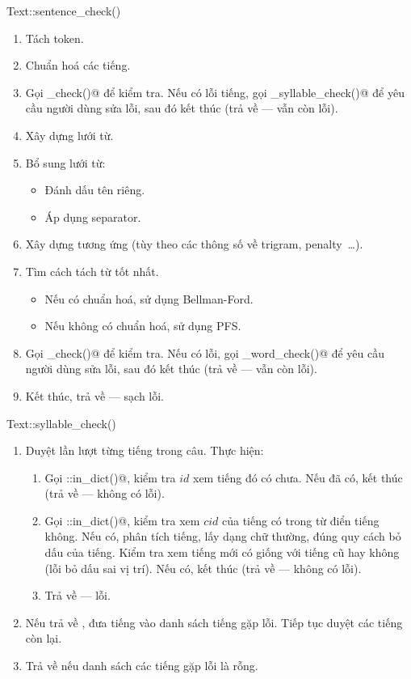 \documentclass[a4paper,oneside,14pt]{extbook} %
\begin{document}
\begin{algo}
\caption{Text::sentence\_check()}
\label{algo:Text::sentence_check}
  \begin{enumerate}
  \item Tách token.
  \item Chuẩn hoá các tiếng.
  \item Gọi \verb@syllable_check()@ để kiểm tra. Nếu có lỗi tiếng, gọi
    \verb@ui_syllable_check()@ để yêu cầu người dùng sửa lỗi, sau đó
    kết thúc (trả về \verb@false@ --- vẫn còn lỗi).
  \item Xây dựng lưới từ.
  \item Bổ sung lưới từ:
    \begin{itemize}
    \item Đánh dấu tên riêng.
    \item Áp dụng separator.
    \end{itemize}
  \item Xây dựng \verb@DAG@ tương ứng (tùy theo các thông số về
    trigram, penalty~\ldots).
  \item Tìm cách tách từ tốt nhất. 
    \begin{itemize}
    \item Nếu có chuẩn hoá, sử dụng Bellman-Ford.
    \item Nếu không có chuẩn hoá, sử dụng PFS.
    \end{itemize}
  \item Gọi \verb@word_check()@ để kiểm tra. Nếu có lỗi, gọi
    \verb@ui_word_check()@ để yêu cầu người dùng sửa lỗi, sau đó kết
    thúc (trả về \verb@false@ --- vẫn còn lỗi).
  \item Kết thúc, trả về \verb@true@ --- sạch lỗi.
  \end{enumerate}
\end{algo}

\begin{algo}
\caption{Text::syllable\_check()}
\label{algo:Text::syllable_check}
\begin{enumerate}
\item Duyệt lần lượt từng tiếng trong câu. Thực hiện:
  \begin{enumerate}
  \item Gọi \verb@VSpell::in_dict()@, kiểm tra $id$ xem tiếng đó có
    chưa. Nếu đã có, kết thúc (trả về \verb@true@ --- không có lỗi).
  \item Gọi \verb@StringArchive::in_dict()@, kiểm tra xem $cid$ của
    tiếng có trong từ điển tiếng không. Nếu có, phân tích tiếng, lấy
    dạng chữ thường, đúng quy cách bỏ dấu của tiếng. Kiểm tra xem tiếng
    mới có giống với tiếng cũ hay không (lỗi bỏ dấu sai vị trí). Nếu có,
    kết thúc (trả về \verb@true@ --- không có lỗi).
  \item Trả về \verb@false@ --- lỗi.
  \end{enumerate}
\item Nếu trả về \verb@false@, đưa tiếng vào danh sách tiếng gặp
  lỗi. Tiếp tục duyệt các tiếng còn lại.
\item Trả về \verb@true@ nếu danh sách các tiếng gặp lỗi là rỗng.
\end{enumerate}
\end{algo}
\end{document}
